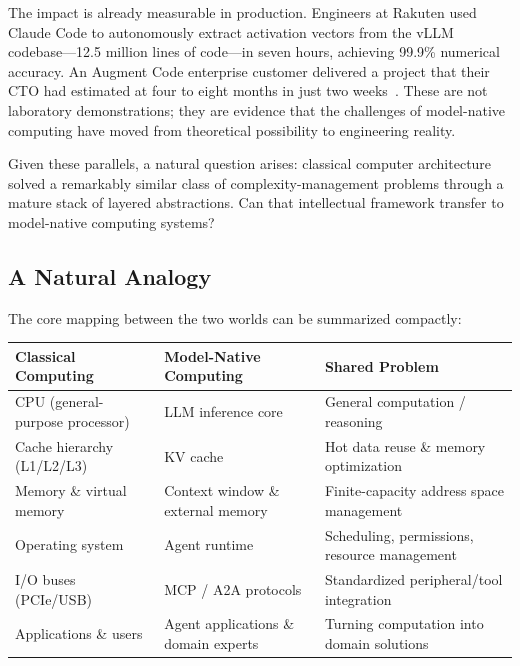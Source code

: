 \documentclass[11pt,a4paper]{article}
\begin{document}
The impact is already measurable in production.
Engineers at Rakuten used Claude Code to autonomously extract activation vectors from the vLLM codebase---12.5 million lines of code---in seven hours, achieving 99.9\% numerical accuracy.
An Augment Code enterprise customer delivered a project that their CTO had estimated at four to eight months in just two weeks~\cite{anthropic2026agenticreport}.
These are not laboratory demonstrations; they are evidence that the challenges of model-native computing have moved from theoretical possibility to engineering reality.

Given these parallels, a natural question arises: classical computer architecture solved a remarkably similar class of complexity-management problems through a mature stack of layered abstractions.
Can that intellectual framework transfer to model-native computing systems?

\subsection{A Natural Analogy}

The core mapping between the two worlds can be summarized compactly:

\begin{center}
\small
\begin{tabularx}{\textwidth}{>{\raggedright\arraybackslash}p{}>{\raggedright\arraybackslash}p{}>{\raggedright\arraybackslash}p{}}
\hline
\textbf{Classical Computing} & \textbf{Model-Native Computing} & \textbf{Shared Problem} \\
\hline
CPU (general-purpose processor) & LLM inference core & General computation / reasoning \\
Cache hierarchy (L1/L2/L3) & KV cache & Hot data reuse \& memory optimization \\
Memory \& virtual memory & Context window \& external memory & Finite-capacity address space management \\
Operating system & Agent runtime & Scheduling, permissions, resource management \\
I/O buses (PCIe/USB) & MCP / A2A protocols & Standardized peripheral/tool integration \\
Applications \& users & Agent applications \& domain experts & Turning computation into domain solutions \\
\hline
\end{tabularx}
\end{center}
\end{document}
